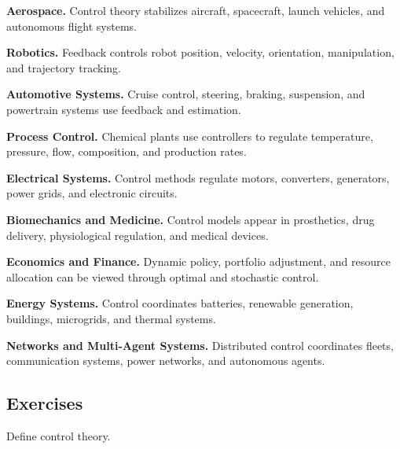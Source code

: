 \begin{applicationbox}

\textbf{Aerospace.}
Control theory stabilizes aircraft, spacecraft, launch vehicles, and
autonomous flight systems.

\medskip

\textbf{Robotics.}
Feedback controls robot position, velocity, orientation, manipulation, and
trajectory tracking.

\medskip

\textbf{Automotive Systems.}
Cruise control, steering, braking, suspension, and powertrain systems use
feedback and estimation.

\medskip

\textbf{Process Control.}
Chemical plants use controllers to regulate temperature, pressure, flow,
composition, and production rates.

\medskip

\textbf{Electrical Systems.}
Control methods regulate motors, converters, generators, power grids, and
electronic circuits.

\medskip

\textbf{Biomechanics and Medicine.}
Control models appear in prosthetics, drug delivery, physiological
regulation, and medical devices.

\medskip

\textbf{Economics and Finance.}
Dynamic policy, portfolio adjustment, and resource allocation can be viewed
through optimal and stochastic control.

\medskip

\textbf{Energy Systems.}
Control coordinates batteries, renewable generation, buildings, microgrids,
and thermal systems.

\medskip

\textbf{Networks and Multi-Agent Systems.}
Distributed control coordinates fleets, communication systems, power
networks, and autonomous agents.

\end{applicationbox}

\subsection{Exercises}
\label{subsec:control-theory-exercises}

\begin{exercise}[1]
Define control theory.
\end{exercise}

